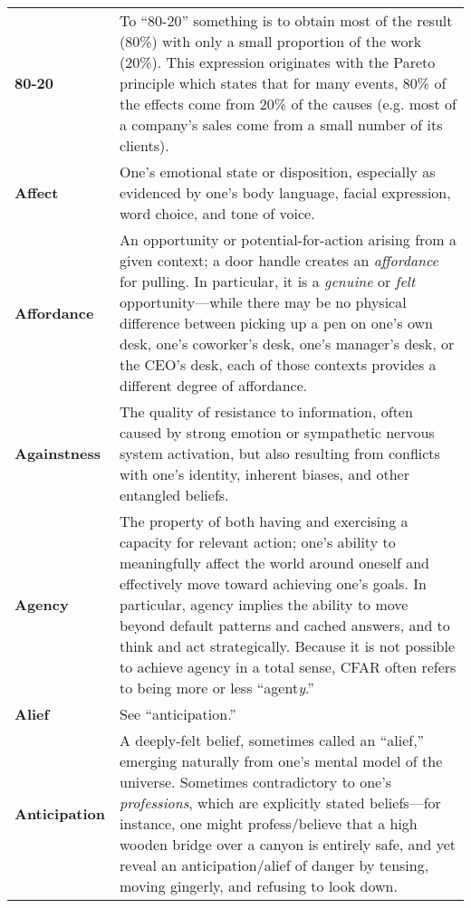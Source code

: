 \setlength{\extrarowheight}{10pt}
\begin{longtable} { p{} p{} }

\textbf{80-20} & To ``80-20'' something is to obtain most of the result (80\%) with only a small proportion of the work (20\%).  This expression originates with the Pareto principle which states that for many events, 80\% of the effects come from 20\% of the causes (e.g. most of a company's sales come from a small number of its clients).\\

\textbf{Affect} & One's emotional state or disposition, especially as evidenced by one's body language, facial expression, word choice, and tone of voice.\\

\textbf{Affordance} & An opportunity or potential-for-action arising from a given context; a door handle creates an \emph{affordance} for pulling.  In particular, it is a \emph{genuine} or \emph{felt} opportunity---while there may be no physical difference between picking up a pen on one's own desk, one's coworker's desk, one's manager's desk, or the CEO's desk, each of those contexts provides a different degree of affordance.\\

\textbf{Againstness} & The quality of resistance to information, often caused by strong emotion or sympathetic nervous system activation, but also resulting from conflicts with one's identity, inherent biases, and other entangled beliefs.\\

\textbf{Agency} & The property of both having and exercising a capacity for relevant action; one's ability to meaningfully affect the world around oneself and effectively move toward achieving one's goals.  In particular, agency implies the ability to move beyond default patterns and cached answers, and to think and act strategically.  Because it is not possible to achieve agency in a total sense, CFAR often refers to being more or less ``agent\emph{y}.''\\

\textbf{Alief} & See ``anticipation.''\\

\textbf{Anticipation} & A deeply-felt belief, sometimes called an ``alief,'' emerging naturally from one's mental model of the universe.  Sometimes contradictory to one's \emph{professions}, which are explicitly stated beliefs---for instance, one might profess/believe that a high wooden bridge over a canyon is entirely safe, and yet reveal an anticipation/alief of danger by tensing, moving gingerly, and refusing to look down.\\


\end{longtable}
